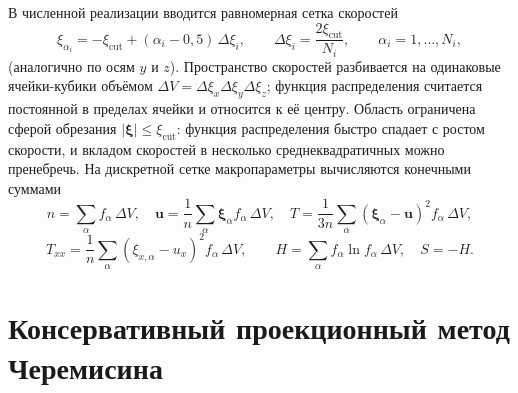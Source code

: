 \documentclass[14pt,a4paper]{extreport}
\numberwithin{equation}{chapter}
\numberwithin{figure}{chapter}
\numberwithin{table}{chapter}
\newcommand{\xv}{\boldsymbol{\xi}}
\begin{document}
В численной реализации вводится равномерная сетка скоростей
\begin{equation}
  \xi_{\alpha_i}=-\xi_{\mathrm{cut}}+(\alpha_i-0{,}5)\,\Delta\xi_i,\qquad
  \Delta\xi_i=\frac{2\xi_{\mathrm{cut}}}{N_i},\qquad \alpha_i=1,\dots,N_i,
\end{equation}
(аналогично по осям $y$ и $z$).
Пространство скоростей разбивается на одинаковые ячейки-кубики объёмом $\Delta V=\Delta\xi_x\Delta\xi_y\Delta\xi_z$;
функция распределения считается постоянной в пределах ячейки и относится к её центру.
Область ограничена сферой обрезания $|\xv|\le\xi_{\mathrm{cut}}$: функция распределения быстро спадает с ростом
скорости, и вкладом скоростей в несколько среднеквадратичных можно пренебречь.
На дискретной сетке макропараметры вычисляются конечными суммами
\begin{equation}
  n=\sum_\alpha f_\alpha\,\Delta V,\quad
  \mathbf u=\frac1n\sum_\alpha \xv_\alpha f_\alpha\,\Delta V,\quad
  T=\frac{1}{3n}\sum_\alpha (\xv_\alpha-\mathbf u)^2 f_\alpha\,\Delta V,
\end{equation}
\begin{equation}
  T_{xx}=\frac1n\sum_\alpha (\xi_{x,\alpha}-u_x)^2 f_\alpha\,\Delta V,\qquad
  H=\sum_\alpha f_\alpha\ln f_\alpha\,\Delta V,\quad S=-H.
\end{equation}

\section{Консервативный проекционный метод Черемисина}
\end{document}
